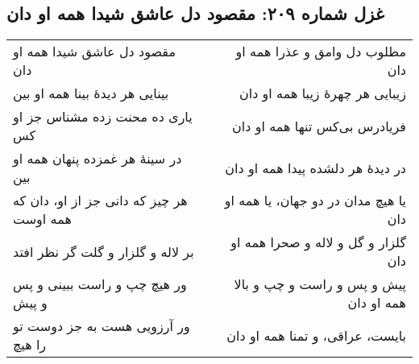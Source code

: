 \begin{center}
\section*{غزل شماره ۲۰۹: مقصود دل عاشق شیدا همه او دان}
\label{sec:209}
\begin{longtable}{l p{0.5cm} r}
مقصود دل عاشق شیدا همه او دان
&&
مطلوب دل وامق و عذرا همه او دان
\\
بینایی هر دیدهٔ بینا همه او بین
&&
زیبایی هر چهرهٔ زیبا همه او دان
\\
یاری ده محنت زده مشناس جز او کس
&&
فریادرس بی‌کس تنها همه او دان
\\
در سینهٔ هر غمزده پنهان همه او بین
&&
در دیدهٔ هر دلشده پیدا همه او دان
\\
هر چیز که دانی جز از او، دان که همه اوست
&&
یا هیچ مدان در دو جهان، یا همه او دان
\\
بر لاله و گلزار و گلت گر نظر افتد
&&
گلزار و گل و لاله و صحرا همه او دان
\\
ور هیچ چپ و راست ببینی و پس و پیش
&&
پیش و پس و راست و چپ و بالا همه او دان
\\
ور آرزویی هست به جز دوست تو را هیچ
&&
بایست، عراقی، و تمنا همه او دان
\\
\end{longtable}
\end{center}
